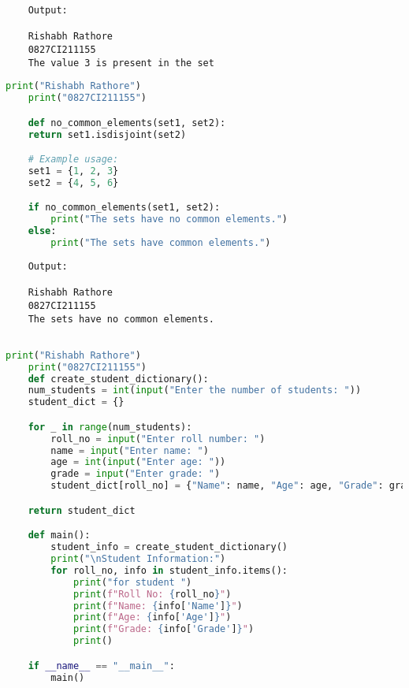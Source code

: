 \documentclass{report}
\begin{document}
\begin{verbatim}
	Output:

	Rishabh Rathore
	0827CI211155
	The value 3 is present in the set

\end{verbatim}


\bigskip


\sol 
\begin{lstlisting}[language=Python]
	print("Rishabh Rathore")
	print("0827CI211155")

	def no_common_elements(set1, set2):
    return set1.isdisjoint(set2)

	# Example usage:
	set1 = {1, 2, 3}
	set2 = {4, 5, 6}

	if no_common_elements(set1, set2):
		print("The sets have no common elements.")
	else:
		print("The sets have common elements.")

\end{lstlisting}

\begin{verbatim}
	Output:

	Rishabh Rathore
	0827CI211155
	The sets have no common elements.


\end{verbatim}


\bigskip


\sol 
\begin{lstlisting}[language=Python]
	print("Rishabh Rathore")
	print("0827CI211155")
	def create_student_dictionary():
    num_students = int(input("Enter the number of students: "))
    student_dict = {}

    for _ in range(num_students):
        roll_no = input("Enter roll number: ")
        name = input("Enter name: ")
        age = int(input("Enter age: "))
        grade = input("Enter grade: ")
        student_dict[roll_no] = {"Name": name, "Age": age, "Grade": grade}

    return student_dict

	def main():
		student_info = create_student_dictionary()
		print("\nStudent Information:")
		for roll_no, info in student_info.items():
			print("for student ")
			print(f"Roll No: {roll_no}")
			print(f"Name: {info['Name']}")
			print(f"Age: {info['Age']}")
			print(f"Grade: {info['Grade']}")
			print()

	if __name__ == "__main__":
		main()
  

\end{lstlisting}
\end{document}
